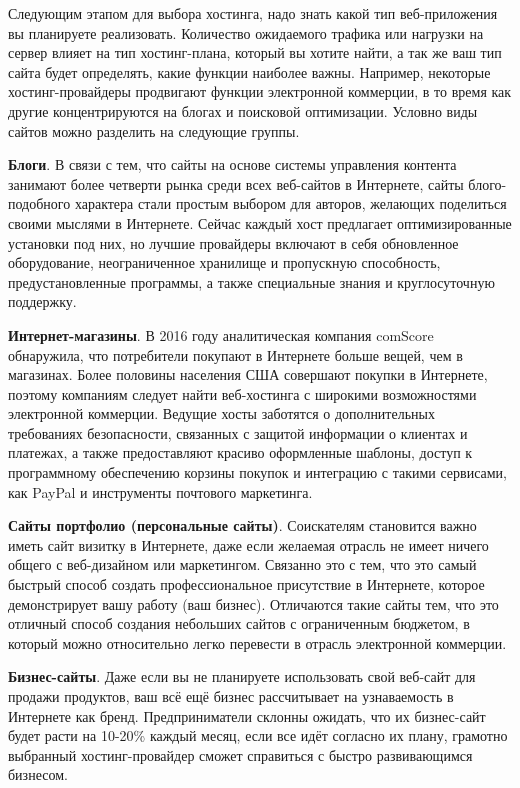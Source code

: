 Следующим этапом для выбора хостинга, надо знать какой тип веб-приложения вы планируете реализовать. Количество ожидаемого трафика или нагрузки на сервер влияет на тип хостинг-плана, который вы хотите найти, а так же ваш тип сайта будет определять, какие функции наиболее важны. Например, некоторые хостинг-провайдеры продвигают функции электронной коммерции, в то время как другие концентрируются на блогах и поисковой оптимизации. Условно виды сайтов можно разделить на следующие группы.

\textbf{Блоги}. В связи с тем, что сайты на основе системы управления контента занимают более четверти рынка \cite{UsageSta21:online,NeedtoKn7:online} среди всех веб-сайтов в Интернете, сайты блого-подобного характера стали простым выбором для авторов, желающих поделиться своими мыслями в Интернете. Сейчас каждый хост предлагает оптимизированные установки под них, но лучшие провайдеры включают в себя обновленное оборудование, неограниченное хранилище и пропускную способность, предустановленные программы, а также специальные знания и круглосуточную поддержку.

\textbf{Интернет-магазины}. В 2016 году аналитическая компания comScore обнаружила, что потребители покупают в Интернете больше вещей, чем в магазинах\cite{2016UPSP16:online}. Более половины населения США совершают покупки в Интернете, поэтому компаниям следует найти веб-хостинга с широкими возможностями электронной коммерции. Ведущие хосты заботятся о дополнительных требованиях безопасности, связанных с защитой информации о клиентах и платежах, а также предоставляют красиво оформленные шаблоны, доступ к программному обеспечению корзины покупок и интеграцию с такими сервисами, как PayPal и инструменты почтового маркетинга.

\textbf{Сайты портфолио (персональные сайты)}. Соискателям становится важно иметь сайт визитку в Интернете, даже если желаемая отрасль не имеет ничего общего с веб-дизайном или маркетингом. Связанно это с тем, что это самый быстрый способ создать профессиональное присутствие в Интернете, которое демонстрирует вашу работу (ваш бизнес). Отличаются такие сайты тем, что это отличный способ создания небольших сайтов с ограниченным бюджетом, в который можно относительно легко перевести в отрасль электронной коммерции.

\textbf{Бизнес-сайты}.  Даже если вы не планируете использовать свой веб-сайт для продажи продуктов, ваш всё ещё бизнес рассчитывает на узнаваемость в Интернете как бренд. Предприниматели склонны ожидать, что их бизнес-сайт будет расти на 10-20\% каждый месяц, если все идёт согласно их плану, грамотно выбранный хостинг-провайдер сможет справиться с быстро развивающимся бизнесом.


